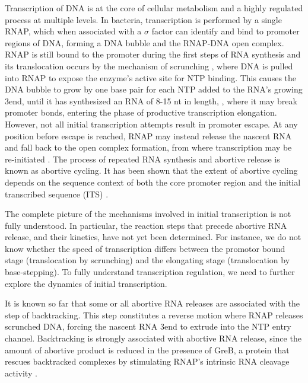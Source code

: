 %
Transcription of DNA is at the core of cellular metabolism and a highly
regulated process at multiple levels. In bacteria, transcription is performed
by a single RNAP, which when associated with a $\sigma$ factor can identify
and bind to promoter regions of DNA, forming a DNA bubble and the RNAP-DNA
open complex. RNAP is still bound to the promoter during the first steps of
RNA synthesis and its translocation occurs by the mechanism of scrunching
\cite{revyakin_abortive_2006, kapanidis_initial_2006}, where DNA is pulled
into RNAP to expose the enzyme's active site for NTP binding. This causes the
DNA bubble to grow by one base pair for each NTP added to the RNA's growing
3\ppp end, until it has synthesized an RNA of 8-15 nt in length,
\cite{carpousis_cycling_1980,hsu_vitro_2003,tang_real-time_2009,hsu_initial_2006},
where it may break promoter bonds,  entering the phase of productive
transcription elongation. However, not all initial transcription attempts
result in promoter escape. At any position before escape is reached, RNAP may
instead release the nascent RNA and fall back to the open complex formation,
from where transcription may be re-initiated \cite{carpousis_cycling_1980}.
The process of repeated RNA synthesis and abortive release is known as
abortive cycling. It has been shown that the extent of abortive cycling
depends on the sequence context of both the core promoter region and the
initial transcribed sequence (ITS) \cite{hsu_initial_2006, hsu_promoter_2002,
vo_vitro_2003}.

The complete picture of the mechanisms involved in initial transcription is
not fully understood. In particular, the reaction steps that precede abortive
RNA release, and their kinetics, have not yet been determined. For instance, we
do not know whether the speed of transcription differs between the promotor
bound stage (translocation by scrunching) and the elongating stage
(translocation by base-stepping). To fully understand transcription
regulation, we need to further explore the dynamics of initial transcription. 

It is known so far that some or all abortive RNA releases are associated with
the step of backtracking. This step constitutes a reverse motion where RNAP
releases scrunched DNA, forcing the nascent RNA 3\ppp end to extrude into the
NTP entry channel. Backtracking is strongly associated with abortive RNA
release, since the amount of abortive product is reduced in the presence of
GreB, a protein that rescues backtracked complexes by stimulating RNAP's
intrinsic RNA cleavage activity
\cite{hsu_initial_2006,hsu_escherichia_1995,feng_grea-induced_1994}.

